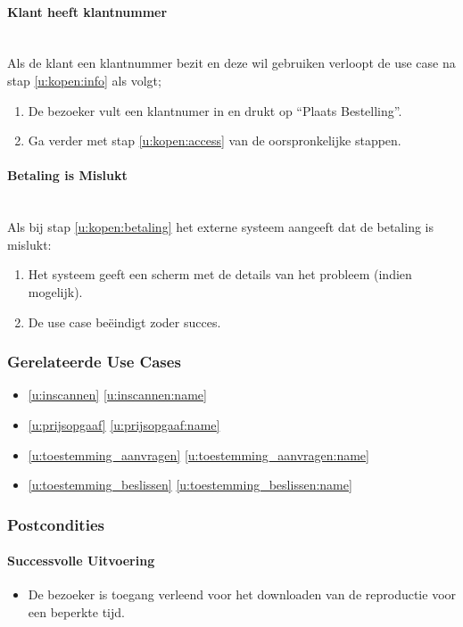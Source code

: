 \documentclass[a4paper,titlepage]{report}
\def\namedref#1{\ref{#1} \ref{#1:name}}
\begin{document}
        \paragraph{Klant heeft klantnummer}\hfill\\
          Als de klant een klantnummer bezit en deze wil gebruiken verloopt de
          use case na stap \ref{u:kopen:info} als volgt;

          \begin{enumerate}
            \item De bezoeker vult een klantnumer in en drukt op ``Plaats
              Bestelling''.
            \item Ga verder met stap \ref{u:kopen:access} van de
              oorspronkelijke stappen.
          \end{enumerate}
        \paragraph{Betaling is Mislukt}\hfill\\
          Als bij stap \ref{u:kopen:betaling} het externe systeem aangeeft dat
          de betaling is mislukt:

          \begin{enumerate}
            \item Het systeem geeft een scherm met de details van het probleem
            (indien mogelijk).
            \item De use case be\"eindigt zoder succes.
          \end{enumerate}
      \subsubsection{Gerelateerde Use Cases}
        \begin{itemize}
          \item \namedref{u:inscannen}
          \item \namedref{u:prijsopgaaf}
          \item \namedref{u:toestemming_aanvragen}
          \item \namedref{u:toestemming_beslissen}
        \end{itemize}
      \subsubsection{Postcondities}
        \paragraph{Successvolle Uitvoering}
          \begin{itemize}
            \item De bezoeker is toegang verleend voor het downloaden van de
              reproductie voor een beperkte tijd.
          \end{itemize}
\end{document}
